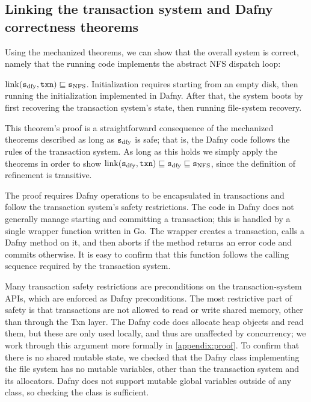 \subsection{Linking the transaction system and Dafny correctness theorems}
\label{sec:proof:linking}

Using the mechanized theorems, we can show that the overall system is correct,
namely that the running code implements the abstract NFS dispatch loop:

\begin{theorem}
  $\mathrm{link}(\texttt{s}_{\mathrm{dfy}}, \texttt{txn}) \sqsubseteq \texttt{s}_{\mathrm{NFS}}$. Initialization requires
  starting from an empty disk, then running the initialization implemented in
  Dafny. After that, the system boots by first recovering the transaction
  system's state, then running file-system recovery.
  \label{thm:correctness}
\end{theorem}

This theorem's proof is a straightforward consequence of the mechanized theorems
described as long as $\texttt{s}_{\mathrm{dfy}}$ is safe; that is, the Dafny code follows the rules of
the transaction system. As long as this
holds we simply apply the theorems in order to show
$\mathrm{link}(\texttt{s}_{\mathrm{dfy}}, \texttt{txn}) \sqsubseteq \texttt{s}_{\mathrm{dfy}} \sqsubseteq \texttt{s}_{\mathrm{NFS}}$, since
the definition of refinement is transitive.

The proof requires Dafny operations to be encapsulated in transactions
and follow the transaction system's safety restrictions.
The code in Dafny does not generally manage starting and
committing a transaction; this is handled by a single wrapper function written
in Go. The wrapper creates a transaction, calls a Dafny method on it,
and then aborts if the method returns an error code and commits otherwise.
It is easy to confirm that this function follows the calling sequence required
by the transaction system.

Many transaction safety restrictions are preconditions on the
transaction-system APIs, which are enforced as Dafny preconditions.  The most
restrictive part of safety is that transactions are not allowed to read or write
shared memory, other than through the Txn layer. The Dafny code does allocate
heap objects and read them, but these are only used locally, and thus are
unaffected by concurrency; we work through this argument more formally in
\autoref{appendix:proof}. To confirm that there is no shared mutable state, we
checked that the Dafny class implementing the file system has no mutable
variables, other than the transaction system and its allocators.  Dafny does not
support mutable global variables outside of any class, so checking the class is sufficient.

